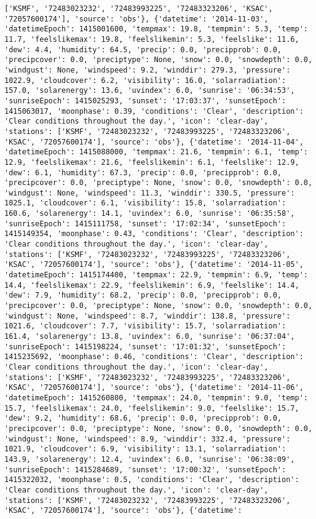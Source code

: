 \documentclass[
  letterpaper,
  DIV=11,
  numbers=noendperiod]{scrartcl}
\begin{document}
\begin{verbatim}
['KSMF', '72483023232', '72483993225', '72483323206', 'KSAC', '72057600174'], 'source': 'obs'}, {'datetime': '2014-11-03', 'datetimeEpoch': 1415001600, 'tempmax': 19.8, 'tempmin': 5.3, 'temp': 11.7, 'feelslikemax': 19.8, 'feelslikemin': 5.3, 'feelslike': 11.6, 'dew': 4.4, 'humidity': 64.5, 'precip': 0.0, 'precipprob': 0.0, 'precipcover': 0.0, 'preciptype': None, 'snow': 0.0, 'snowdepth': 0.0, 'windgust': None, 'windspeed': 9.2, 'winddir': 279.3, 'pressure': 1022.9, 'cloudcover': 6.2, 'visibility': 16.0, 'solarradiation': 157.0, 'solarenergy': 13.6, 'uvindex': 6.0, 'sunrise': '06:34:53', 'sunriseEpoch': 1415025293, 'sunset': '17:03:37', 'sunsetEpoch': 1415063017, 'moonphase': 0.39, 'conditions': 'Clear', 'description': 'Clear conditions throughout the day.', 'icon': 'clear-day', 'stations': ['KSMF', '72483023232', '72483993225', '72483323206', 'KSAC', '72057600174'], 'source': 'obs'}, {'datetime': '2014-11-04', 'datetimeEpoch': 1415088000, 'tempmax': 21.6, 'tempmin': 6.1, 'temp': 12.9, 'feelslikemax': 21.6, 'feelslikemin': 6.1, 'feelslike': 12.9, 'dew': 6.1, 'humidity': 67.3, 'precip': 0.0, 'precipprob': 0.0, 'precipcover': 0.0, 'preciptype': None, 'snow': 0.0, 'snowdepth': 0.0, 'windgust': None, 'windspeed': 11.3, 'winddir': 330.5, 'pressure': 1025.1, 'cloudcover': 6.1, 'visibility': 15.8, 'solarradiation': 160.6, 'solarenergy': 14.1, 'uvindex': 6.0, 'sunrise': '06:35:58', 'sunriseEpoch': 1415111758, 'sunset': '17:02:34', 'sunsetEpoch': 1415149354, 'moonphase': 0.43, 'conditions': 'Clear', 'description': 'Clear conditions throughout the day.', 'icon': 'clear-day', 'stations': ['KSMF', '72483023232', '72483993225', '72483323206', 'KSAC', '72057600174'], 'source': 'obs'}, {'datetime': '2014-11-05', 'datetimeEpoch': 1415174400, 'tempmax': 22.9, 'tempmin': 6.9, 'temp': 14.4, 'feelslikemax': 22.9, 'feelslikemin': 6.9, 'feelslike': 14.4, 'dew': 7.9, 'humidity': 68.2, 'precip': 0.0, 'precipprob': 0.0, 'precipcover': 0.0, 'preciptype': None, 'snow': 0.0, 'snowdepth': 0.0, 'windgust': None, 'windspeed': 8.7, 'winddir': 138.8, 'pressure': 1021.6, 'cloudcover': 7.7, 'visibility': 15.7, 'solarradiation': 161.4, 'solarenergy': 13.8, 'uvindex': 6.0, 'sunrise': '06:37:04', 'sunriseEpoch': 1415198224, 'sunset': '17:01:32', 'sunsetEpoch': 1415235692, 'moonphase': 0.46, 'conditions': 'Clear', 'description': 'Clear conditions throughout the day.', 'icon': 'clear-day', 'stations': ['KSMF', '72483023232', '72483993225', '72483323206', 'KSAC', '72057600174'], 'source': 'obs'}, {'datetime': '2014-11-06', 'datetimeEpoch': 1415260800, 'tempmax': 24.0, 'tempmin': 9.0, 'temp': 15.7, 'feelslikemax': 24.0, 'feelslikemin': 9.0, 'feelslike': 15.7, 'dew': 9.2, 'humidity': 68.6, 'precip': 0.0, 'precipprob': 0.0, 'precipcover': 0.0, 'preciptype': None, 'snow': 0.0, 'snowdepth': 0.0, 'windgust': None, 'windspeed': 8.9, 'winddir': 332.4, 'pressure': 1021.9, 'cloudcover': 6.9, 'visibility': 13.1, 'solarradiation': 143.9, 'solarenergy': 12.4, 'uvindex': 6.0, 'sunrise': '06:38:09', 'sunriseEpoch': 1415284689, 'sunset': '17:00:32', 'sunsetEpoch': 1415322032, 'moonphase': 0.5, 'conditions': 'Clear', 'description': 'Clear conditions throughout the day.', 'icon': 'clear-day', 'stations': ['KSMF', '72483023232', '72483993225', '72483323206', 'KSAC', '72057600174'], 'source': 'obs'}, {'datetime': 
\end{verbatim}
\end{document}
